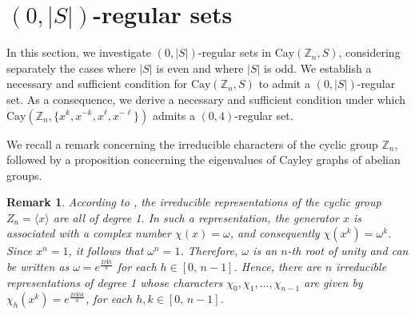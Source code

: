 \documentclass[12pt]{article}
\newtheorem{rem}[formula]{Remark}
\begin{document}
\section{\bf $(0,|S|)$-regular sets}
\quad In this section, we investigate $(0,|S|)$-regular sets in  $\mathrm{Cay}(\mathbb{Z}_n, S)$, considering separately the cases where $|S|$ is even and where $|S|$ is odd. We establish a necessary and sufficient condition for $\mathrm{Cay}(\mathbb{Z}_n, S)$ to admit a $(0,|S|)$-regular set. As a consequence, we derive a necessary and sufficient condition under which $\mathrm{Cay}(\mathbb{Z}_n,\{x^k, x^{-k}, x^\ell, x^{-\ell}\})$ admits a $(0,4)$-regular set.

We recall a remark concerning the irreducible characters of the cyclic
group $\mathbb{Z}_n$, followed by a proposition concerning the
eigenvalues of Cayley graphs of abelian groups.

\begin{rem}\label{rem:irr-rep}
According to \cite{Serre}, the irreducible representations of the cyclic group \(Z_n=\langle x\rangle\) are all of degree 1. In such a representation, the generator \(x\) is associated with a complex number \(\chi(x)=\omega\), and consequently \(\chi(x^k)=\omega^k\). Since \(x^n=1\), it follows that \(\omega^n=1\). Therefore, \(\omega\) is an \(n\)-th root of unity and can be written as $\omega = e^\frac{2\pi \mathbf{i} h}{n}$ for each $h \in [0,\, n-1]$. Hence, there are \(n\) irreducible representations of degree 1 whose characters \(\chi_0, \chi_1, \dots, \chi_{n-1}\) are given by $\chi_h(x^k)=e^\frac{2\pi \mathbf{i} hk}{n}$, for each $h, k \in [0,\, n-1]$.	
\end{rem}
\end{document}
